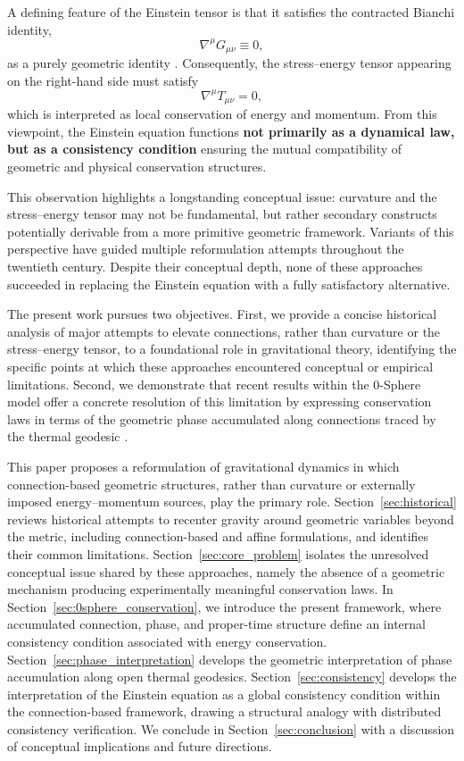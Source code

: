 \documentclass[%
 reprint,
 amsmath,amssymb,
 aps,
 prb,
]{revtex4-2}
\numberwithin{equation}{section}
\begin{document}
A defining feature of the Einstein tensor is that it satisfies the contracted Bianchi identity,
\begin{equation}
\nabla^\mu G_{\mu\nu} \equiv 0,
\end{equation}
as a purely geometric identity \cite{Wald}. Consequently, the stress--energy tensor appearing on the right-hand side must satisfy
\begin{equation}
\nabla^\mu T_{\mu\nu} = 0,
\end{equation}
which is interpreted as local conservation of energy and momentum. From this viewpoint, the Einstein equation functions \textbf{not primarily as a dynamical law, but as a consistency condition} ensuring the mutual compatibility of geometric and physical conservation structures.

This observation highlights a longstanding conceptual issue: curvature and the stress--energy tensor may not be fundamental, but rather secondary constructs potentially derivable from a more primitive geometric framework. Variants of this perspective have guided multiple reformulation attempts throughout the twentieth century. Despite their conceptual depth, none of these approaches succeeded in replacing the Einstein equation with a fully satisfactory alternative.

The present work pursues two objectives. First, we provide a concise historical analysis of major attempts to elevate connections, rather than curvature or the stress--energy tensor, to a foundational role in gravitational theory, identifying the specific points at which these approaches encountered conceptual or empirical limitations. Second, we demonstrate that recent results within the 0-Sphere model offer a concrete resolution of this limitation by expressing conservation laws in terms of the geometric phase accumulated along connections traced by the thermal geodesic \cite{hanamura17765017}.

This paper proposes a reformulation of gravitational dynamics in which connection-based geometric structures, rather than curvature or externally imposed energy--momentum sources, play the primary role. Section~\ref{sec:historical} reviews historical attempts to recenter gravity around geometric variables beyond the metric, including connection-based and affine formulations, and identifies their common limitations. Section~\ref{sec:core_problem} isolates the unresolved conceptual issue shared by these approaches, namely the absence of a geometric mechanism producing experimentally meaningful conservation laws. In Section~\ref{sec:0sphere_conservation}, we introduce the present framework, where accumulated connection, phase, and proper-time structure define an internal consistency condition associated with energy conservation. Section~\ref{sec:phase_interpretation} develops the geometric interpretation of phase accumulation along open thermal geodesics. Section~\ref{sec:consistency} develops the interpretation of the Einstein equation as a global consistency condition within the connection-based framework, drawing a structural analogy with distributed consistency verification. We conclude in Section~\ref{sec:conclusion} with a discussion of conceptual implications and future directions.
\end{document}
